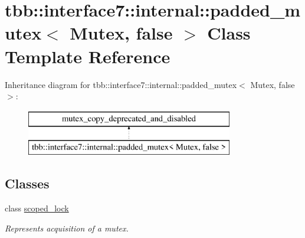 \hypertarget{classtbb_1_1interface7_1_1internal_1_1padded__mutex_3_01Mutex_00_01false_01_4}{}\section{tbb\+:\+:interface7\+:\+:internal\+:\+:padded\+\_\+mutex$<$ Mutex, false $>$ Class Template Reference}
\label{classtbb_1_1interface7_1_1internal_1_1padded__mutex_3_01Mutex_00_01false_01_4}
Inheritance diagram for tbb\+:\+:interface7\+:\+:internal\+:\+:padded\+\_\+mutex$<$ Mutex, false $>$\+:\begin{figure}[H]
\begin{center}
\leavevmode
\includegraphics[height=2.000000cm]{classtbb_1_1interface7_1_1internal_1_1padded__mutex_3_01Mutex_00_01false_01_4}
\end{center}
\end{figure}
\subsection*{Classes}
\begin{DoxyCompactItemize}
\item 
class \hyperlink{classtbb_1_1interface7_1_1internal_1_1padded__mutex_3_01Mutex_00_01false_01_4_1_1scoped__lock}{scoped\+\_\+lock}
\begin{DoxyCompactList}\small\item\em Represents acquisition of a mutex. \end{DoxyCompactList}\end{DoxyCompactItemize}
